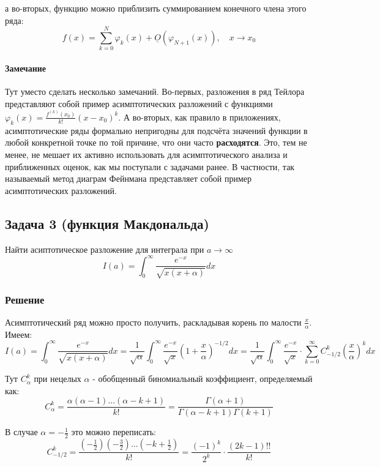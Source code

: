 \documentclass[a4paper,12pt]{article}
\begin{document}
\noindent
а во-вторых, функцию можно приблизить суммированием конечного члена
этого ряда:
\[
f(x)=\sum_{k=0}^{N}\varphi_{k}(x)+\underline{O}(\varphi_{N+1}(x)),\quad x\to x_{0}
\]



\paragraph{Замечание}

Тут уместо сделать несколько замечаний. Во-первых, разложения в ряд
Тейлора представляют собой пример асимптотических разложений с функциями
$\varphi_{k}(x)=\frac{f^{(k)}(x_{0})}{k!}(x-x_{0})^{k}$. А во-вторых,
как правило в приложениях, асимптотические ряды формально непригодны
для подсчёта значений функции в любой конкретной точке по той причине,
что они часто \textbf{расходятся}. Это, тем не менее, не мешает их активно
использовать для асимптотического анализа и приближенных оценок, как
мы поступали с задачами ранее. В частности, так называемый метод диаграм
Фейнмана представляет собой пример асимптотических разложений.


\subsection*{Задача 3 (функция Макдональда)}

Найти асиптотическое разложение для интеграла при $a\to\infty$ 
\[
I(a)=\int_{0}^{\infty}\frac{e^{-x}}{\sqrt{x(x+\alpha)}}dx
\]



\subsubsection*{Решение}

Асимптотический ряд можно просто получить, раскладывая корень по малости
$\frac{x}{\alpha}$. Имеем:
\[
I\left(a\right)=\int_{0}^{\infty}\frac{e^{-x}}{\sqrt{x(x+\alpha)}}dx=\frac{1}{\sqrt{\alpha}}\int_{0}^{\infty}\frac{e^{-x}}{\sqrt{x}}\left(1+\frac{x}{\alpha}\right)^{-1/2}dx=\frac{1}{\sqrt{\alpha}}\int_{0}^{\infty}\frac{e^{-x}}{\sqrt{x}}\cdot\sum_{k=0}^{\infty}C_{-1/2}^{k}\left(\frac{x}{\alpha}\right)^{k}dx
\]

\noindent
Тут $C_{\alpha}^{k}$ при нецелых $\alpha$ - обобщенный биномиальный
коэффициент, определяемый как:
\[
C_{\alpha}^{k}=\frac{\alpha(\alpha-1)\dots(\alpha-k+1)}{k!}=\frac{\Gamma(\alpha+1)}{\Gamma(\alpha-k+1)\Gamma(k+1)}
\]

\noindent
В случае $\alpha=-\frac{1}{2}$ это можно переписать:
\[
C_{-1/2}^{k}
=
\frac{   \left(-\frac{1}{2}\right)  \left(-\frac{3}{2}\right)...\left(-k+\frac{1}{2}\right)}{k!} = \frac{(-1)^{k}}{2^{k}}\cdot\frac{(2k-1)!!}{k!}
\]
\end{document}
